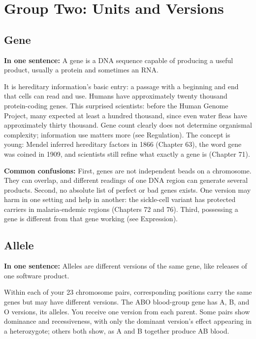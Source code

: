 \section{Group Two: Units and Versions}

\subsection{Gene}

\textbf{In one sentence:} A gene is a DNA sequence capable of producing a useful product, usually a protein and sometimes an RNA.

It is hereditary information's basic entry: a passage with a beginning and end that cells can read and use. Humans have approximately twenty thousand protein-coding genes. This surprised scientists: before the Human Genome Project, many expected at least a hundred thousand, since even water fleas have approximately thirty thousand. Gene count clearly does not determine organismal complexity; information use matters more (see Regulation). The concept is young: Mendel inferred hereditary factors in 1866 (Chapter 63), the word gene was coined in 1909, and scientists still refine what exactly a gene is (Chapter 71).

\textbf{Common confusions:} First, genes are not independent beads on a chromosome. They can overlap, and different readings of one DNA region can generate several products. Second, no absolute list of perfect or bad genes exists. One version may harm in one setting and help in another: the sickle-cell variant has protected carriers in malaria-endemic regions (Chapters 72 and 76). Third, possessing a gene is different from that gene working (see Expression).

\subsection{Allele}

\textbf{In one sentence:} Alleles are different versions of the same gene, like releases of one software product.

Within each of your 23 chromosome pairs, corresponding positions carry the same genes but may have different versions. The ABO blood-group gene has A, B, and O versions, its alleles. You receive one version from each parent. Some pairs show dominance and recessiveness, with only the dominant version's effect appearing in a heterozygote; others both show, as A and B together produce AB blood.

